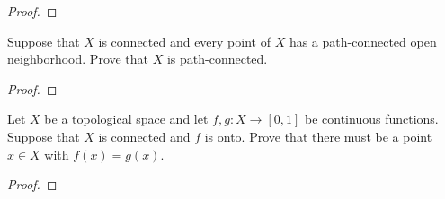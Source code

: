 \begin{proof}
\end{proof}
\begin{problem}
Suppose that $X$ is connected and every point of $X$ has a
path-connected open neighborhood. Prove that $X$ is
path-connected.
\end{problem}
\begin{proof}
\end{proof}
\begin{problem}
Let $X$ be a topological space and let $f,g\colon X\to[0,1]$ be
continuous functions. Suppose that $X$ is connected and $f$ is
onto. Prove that there must be a point $x\in X$ with
$f(x)=g(x)$.
\end{problem}
\begin{proof}
\end{proof}

